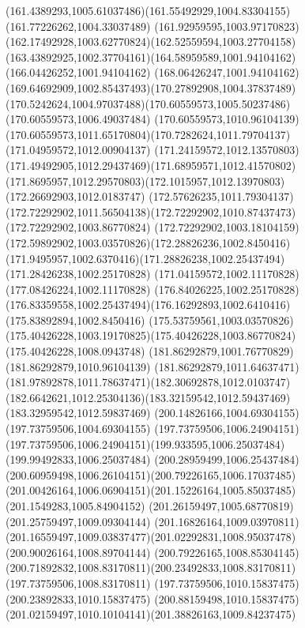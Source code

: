 {{		\curveto(161.4389293,1005.61037486)(161.55492929,1004.83304155)(161.77226262,1004.33037489)
		\curveto(161.92959595,1003.97170823)(162.17492928,1003.62770824)(162.52559594,1003.27704158)
		\curveto(163.43892925,1002.37704161)(164.58959589,1001.94104162)(166.04426252,1001.94104162)
		\curveto(168.06426247,1001.94104162)(169.64692909,1002.85437493)(170.27892908,1004.37837489)
		\curveto(170.5242624,1004.97037488)(170.60559573,1005.50237486)(170.60559573,1006.49037484)
		\lineto(170.60559573,1010.96104139)
		\curveto(170.60559573,1011.65170804)(170.7282624,1011.79704137)(171.04959572,1012.00904137)
		\curveto(171.24159572,1012.13570803)(171.49492905,1012.29437469)(171.68959571,1012.41570802)
		\curveto(171.8695957,1012.29570803)(172.1015957,1012.13970803)(172.26692903,1012.0183747)
		\curveto(172.57626235,1011.79304137)(172.72292902,1011.56504138)(172.72292902,1010.87437473)
		\lineto(172.72292902,1003.86770824)
		\curveto(172.72292902,1003.18104159)(172.59892902,1003.03570826)(172.28826236,1002.8450416)
		\curveto(171.9495957,1002.6370416)(171.28826238,1002.25437494)(171.28426238,1002.25170828)
		\lineto(171.04159572,1002.11170828)
		\lineto(177.08426224,1002.11170828)
		\lineto(176.84026225,1002.25170828)
		\curveto(176.83359558,1002.25437494)(176.16292893,1002.6410416)(175.83892894,1002.8450416)
		\curveto(175.53759561,1003.03570826)(175.40426228,1003.19170825)(175.40426228,1003.86770824)
		\lineto(175.40426228,1008.0943748)
		\lineto(181.86292879,1001.76770829)
		\lineto(181.86292879,1010.96104139)
		\curveto(181.86292879,1011.64637471)(181.97892878,1011.78637471)(182.30692878,1012.0103747)
		\curveto(182.6642621,1012.25304136)(183.32159542,1012.59437469)(183.32959542,1012.59837469)
		\closepath
		\moveto(200.14826166,1004.69304155)
		\lineto(197.73759506,1004.69304155)
		\lineto(197.73759506,1006.24904151)
		\curveto(197.73759506,1006.24904151)(199.933595,1006.25037484)(199.99492833,1006.25037484)
		\curveto(200.28959499,1006.25437484)(200.60959498,1006.26104151)(200.79226165,1006.17037485)
		\curveto(201.00426164,1006.06904151)(201.15226164,1005.85037485)(201.1549283,1005.84904152)
		\lineto(201.26159497,1005.68770819)
		\lineto(201.25759497,1009.09304144)
		\lineto(201.16826164,1009.03970811)
		\curveto(201.16559497,1009.03837477)(201.02292831,1008.95037478)(200.90026164,1008.89704144)
		\curveto(200.79226165,1008.85304145)(200.71892832,1008.83170811)(200.23492833,1008.83170811)
		\lineto(197.73759506,1008.83170811)
		\lineto(197.73759506,1010.15837475)
		\lineto(200.23892833,1010.15837475)
		\curveto(200.88159498,1010.15837475)(201.02159497,1010.10104141)(201.38826163,1009.84237475)
}}

